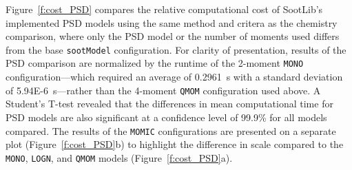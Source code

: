 \documentclass[preprint,letterpaper]{elsarticle}
\begin{document}
Figure~\ref{f:cost_PSD} compares the relative computational cost of SootLib's implemented PSD models using the same method and critera as the chemistry comparison, where only the PSD model or the number of moments used differs from the base \texttt{sootModel} configuration. For clarity of presentation, results of the PSD comparison are normalized by the runtime of the 2-moment \texttt{MONO} configuration---which required an average of 0.2961~\si{s} with a standard deviation of \num{5.94E-6}~\si{s}---rather than the 4-moment \texttt{QMOM} configuration used above. A Student's T-test revealed that the differences in mean computational time for PSD models are also significant at a confidence level of 99.9\% for all models compared. The results of the \texttt{MOMIC} configurations are presented on a separate plot (Figure~\ref{f:cost_PSD}b) to highlight the difference in scale compared to the \texttt{MONO}, \texttt{LOGN}, and \texttt{QMOM} models (Figure~\ref{f:cost_PSD}a).
\end{document}
